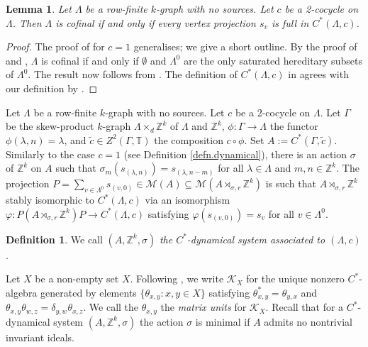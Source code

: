 \documentclass[a4paper, 12pt]{amsart}
\numberwithin{equation}{section}
\newcounter{theorem}
\newtheorem{lemma}[theorem]{Lemma}
\theoremstyle{remark}
\theoremstyle{definition}
\newtheorem{defn}[theorem]{Definition}
\begin{document}
\begin{lemma}\label{lem.3.5.fix}
Let $\Lambda$ be a row-finite $k$-graph with no sources. Let $c$ be a 2-cocycle on
$\Lambda$. Then $\Lambda$ is cofinal if and only if every vertex projection $s_v$ is full
in $C^*(\Lambda,c)$.
\end{lemma}
\begin{proof}
The proof of \cite[Proposition~3.4]{MR2323468} for $c=1$ generalises; we give a short
outline. By the proof of \cite[Proposition~5.1]{MR1777234} and
\cite[Proposition~3.4]{MR2323468}, $\Lambda$ is cofinal if and only if $\emptyset$ and
$\Lambda^0$ are the only saturated hereditary subsets of $\Lambda^0$. The result now
follows from \cite[Theorem~4.6]{MR3262073}. The definition of $C^*(\Lambda,c)$ in
\cite{MR3262073} agrees with our definition by \cite[Lemma~2.2]{MR3311883}.
\end{proof}

Let $\Lambda$ be a row-finite $k$-graph with no sources. Let $c$ be a 2-cocycle on
$\Lambda$. Let $\Gamma$ be the skew-product $k$-graph $\Lambda \times_d {\mathbb{Z}}^k$ of
$\Lambda$ and ${\mathbb{Z}}^k$, $\phi\colon \Gamma \to \Lambda$ the functor  $\phi(\lambda, n) =
\lambda$, and $\tilde{c}\in Z^2(\Gamma,{\mathbb{T}})$ the composition $c\circ \phi$. Set
$A:=C^*(\Gamma, \tilde{c})$. Similarly to the case $c=1$ (see Definition
\ref{defn.dynamical}), there is an action $\sigma$ of ${\mathbb{Z}}^k$ on $A$ such that
$\sigma_m(s_{(\lambda,n)})=s_{(\lambda,n-m)}$ for all $\lambda \in\Lambda$ and $m, n\in
{\mathbb{Z}}^k$. The projection $P=\sum_{v\in \Lambda^0}s_{(v,0)}\in {\mathcal{M}}(A)\subseteq
{\mathcal{M}}(A\rtimes_{\sigma,r}{\mathbb{Z}}^k)$ is such that $A\rtimes_{\sigma,r} {\mathbb{Z}}^k$ stably isomorphic
to $C^*(\Lambda,c)$ via an isomorphism $\varphi\colon P(A\rtimes_{\sigma,r} {\mathbb{Z}}^k)P\to C^*(\Lambda,c)$ satisfying $\varphi(s_{(v,0)})=s_v$ for all $v\in \Lambda^0$.
\begin{defn}\label{system.twisted}
We call $(A,{\mathbb{Z}}^k,\sigma)$ \emph{the $C^*$-dynamical system associated to $(\Lambda, c)$}.
\end{defn}

Let $X$ be a non-empty set $X$. Following \cite{MR3335414}, we write ${\mathcal{K}}_X$ for the
unique nonzero $C^*$-algebra generated by elements $\{\theta_{x,y} : x, y \in X\}$
satisfying $\theta_{x,y}^*=\theta_{y,x}$ and
$\theta_{x,y}\theta_{w,z}=\delta_{y,w}\theta_{x,z}$. We call the $\theta_{x,y}$ the
\emph{matrix units} for ${\mathcal{K}}_X$. Recall that for a $C^*$-dynamical system
$(A,{\mathbb{Z}}^k,\sigma)$  the action $\sigma$ is minimal if $A$ admits no nontrivial
invariant ideals.
\end{document}

